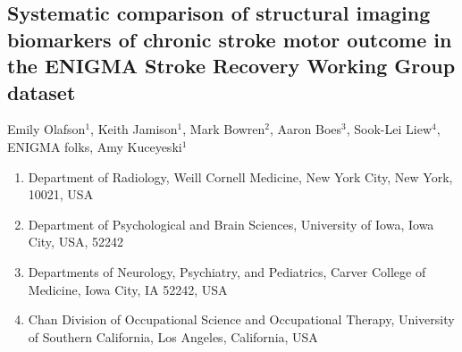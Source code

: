\documentclass[10pt]{article}
\begin{document}
 

\begin{center}
{\large \section*{Systematic comparison of structural imaging biomarkers of chronic stroke motor outcome in the ENIGMA Stroke Recovery Working Group dataset}}
\end{center}

\begin{center}
Emily Olafson$^1$, Keith Jamison$^1$, Mark Bowren$^2$, Aaron Boes$^3$, Sook-Lei Liew$^4$, ENIGMA folks, Amy Kuceyeski$^1$
\end{center}

\begin{enumerate}
\item \textmd{Department of Radiology, Weill Cornell Medicine, New York City, New York, 10021, USA} 
\item \textmd{Department of Psychological and Brain Sciences, University of Iowa, Iowa City, USA, 52242} 
\item \textmd{Departments of Neurology, Psychiatry, and Pediatrics, Carver College of Medicine, Iowa City, IA 52242, USA} 
\item \textmd{Chan Division of Occupational Science and Occupational Therapy, University of Southern California, Los Angeles, California, USA}
\end{enumerate}
\end{document}
